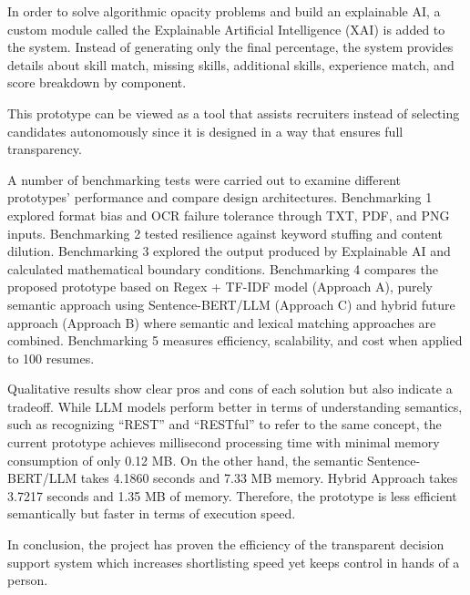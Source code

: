 In order to solve algorithmic opacity problems and build an explainable AI, a custom module called the Explainable Artificial Intelligence (XAI) is added to the system. Instead of generating only the final percentage, the system provides details about skill match, missing skills, additional skills, experience match, and score breakdown by component.

This prototype can be viewed as a tool that assists recruiters instead of selecting candidates autonomously since it is designed in a way that ensures full transparency.

A number of benchmarking tests were carried out to examine different prototypes' performance and compare design architectures. Benchmarking 1 explored format bias and OCR failure tolerance through TXT, PDF, and PNG inputs. Benchmarking 2 tested resilience against keyword stuffing and content dilution. Benchmarking 3 explored the output produced by Explainable AI and calculated mathematical boundary conditions. Benchmarking 4 compares the proposed prototype based on Regex + TF-IDF model (Approach A), purely semantic approach using Sentence-BERT/LLM (Approach C) and hybrid future approach (Approach B) where semantic and lexical matching approaches are combined. Benchmarking 5 measures efficiency, scalability, and cost when applied to 100 resumes.

Qualitative results show clear pros and cons of each solution but also indicate a tradeoff. While LLM models perform better in terms of understanding semantics, such as recognizing ``REST'' and ``RESTful'' to refer to the same concept, the current prototype achieves millisecond processing time with minimal memory consumption of only 0.12 MB. On the other hand, the semantic Sentence-BERT/LLM takes 4.1860 seconds and 7.33 MB memory. Hybrid Approach takes 3.7217 seconds and 1.35 MB of memory. Therefore, the prototype is less efficient semantically but faster in terms of execution speed.

In conclusion, the project has proven the efficiency of the transparent decision support system which increases shortlisting speed yet keeps control in hands of a person.

\clearpage
